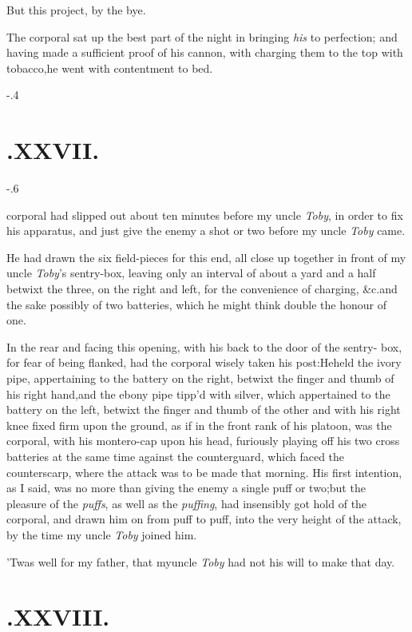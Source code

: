 \documentclass{article}
\begin{document}
\tsh But this project, by the bye.

The corporal sat up the best part of the night in bringing
\textit{his} to perfection; and having made a sufficient proof of his cannon,
with charging them to the top with tobacco,\tsk he went with
contentment to bed.

\etp
\kern-.4\baselineskip
\section{.\enspace XXVII.}

\kern-.6\baselineskip

 corporal had slipped out about
ten minutes before my uncle \textit{Toby}, in order to fix his
apparatus, and just give the enemy a shot or two before my uncle
\textit{Toby} came.

He had drawn the six field-pieces for this end, all close up
together in front of my uncle \textit{Toby}’s sentry-box,
leaving only an interval of about a yard and a half betwixt the
three, on the right and left, for the convenience of charging,
\&c.\tsk and the sake possibly of two batteries, which he
might think double the honour of one.

In the rear and facing this opening, with his back to the door
of the sentry- box, for fear of being flanked, had the corporal
wisely taken his post:\tsh He\break held the ivory pipe, appertaining to the battery on
the right, betwixt the finger and thumb of his right
hand,\tsk and the ebony pipe tipp’d with silver, which
appertained to the battery on the left, betwixt the finger and
thumb of the other\break
\tsh and with his right knee fixed firm
upon the ground, as if in the front rank of his platoon, was the
corporal, with his montero-cap upon his head, furiously playing off
his two cross batteries at the same time against the counterguard,
which faced the counterscarp, where the attack was to be made that
morning.\break
His first intention, as I said, was no more than giving
the enemy a single puff or two;\tsk but the pleasure of the
\textit{puffs}, as well as the \textit{puffing}, had insensibly got
hold of the corporal, and drawn him on from puff to puff, into the
very height of the attack, by the time my uncle \textit{Toby} joined
him.

’Twas well for my father, that my\break uncle \textit{Toby} had
not his will to make that day.

\section{.\enspace XXVIII.}
\end{document}
